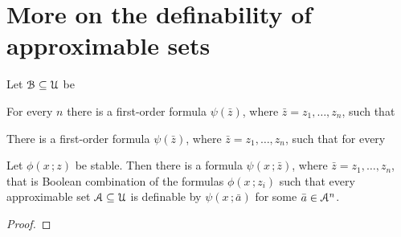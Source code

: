 \documentclass[scombinatorics.tex]{subfiles}
\begin{document}
\section{More on the definability of approximable sets}

Let $\EuScript B\subseteq\EuScript U$ be 

\begin{lemma}
  For every $n$ there is a first-order formula $\psi(\bar z)$, where $\bar z=z_1,\dots,z_n$, such that
  
  
  
  
  There is a first-order formula $\psi(\bar z)$, where $\bar z=z_1,\dots,z_n$, such that for every 
\end{lemma}

\begin{theorem}\label{thm_stable_definability2}
  Let $\phi(x\,;z)$ be stable.
  Then there is a formula $\psi(x\,;\bar z)$, where $\bar z=z_1,\dots,z_n$, that is Boolean combination of the formulas $\phi(x\,;z_i)$ such that every approximable set $\EuScript A\subseteq\EuScript U$ is definable by $\psi(x\,;\bar a)$ for some $\bar a\in\EuScript A^n$.\QED
\end{theorem}



\begin{proof}
  
\end{proof}
\end{document}
